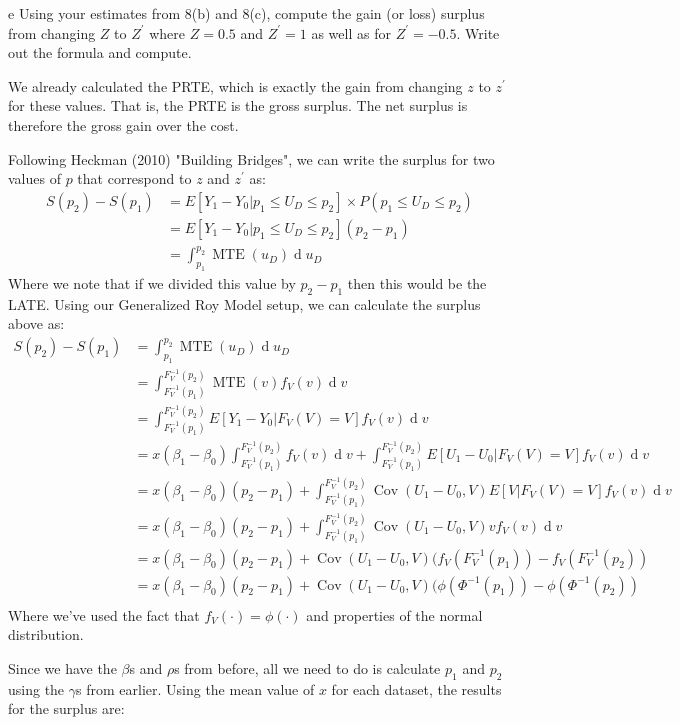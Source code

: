 \documentclass{article}
\begin{document}
\begin{problem}{e}
Using your estimates from 8(b) and 8(c), compute the gain (or loss) surplus from changing $Z$ to $Z^{\prime}$ where $Z=0.5$ and $Z^{\prime}=1$ as well as for $Z^{\prime}=-0.5$. Write out the formula and compute.
\end{problem}
\begin{solution}
We already calculated the PRTE, which is exactly the gain from changing $z$ to $z^\prime$ for these values. That is, the PRTE is the gross surplus. The net surplus is therefore the gross gain over the cost.

Following Heckman (2010) "Building Bridges", we can write the surplus for two values of $p$ that correspond to $z$ and $z^\prime$ as:
\begin{align*}
    S(p_2) - S(p_1) &= E[Y_1-Y_0| p_1 \leq U_D \leq p_2] \times P(p_1 \leq U_D \leq p_2) \\
    &= E[Y_1-Y_0| p_1 \leq U_D \leq p_2] (p_2-p_1) \\
    &= \int_{p_1}^{p_2} \operatorname{MTE}(u_D) \operatorname{d} u_D
\end{align*}
Where we note that if we divided this value by $p_2-p_1$ then this would be the LATE. Using our Generalized Roy Model setup, we can calculate the surplus above as:
\begin{align*}
    S(p_2) - S(p_1) &= \int_{p_1}^{p_2} \operatorname{MTE}(u_D) \operatorname{d} u_D \\
    &= \int_{F_V^{-1}(p_1)}^{F_V^{-1}(p_2)} \operatorname{MTE}(v) f_V(v) \operatorname{d} v \\
    &= \int_{F_V^{-1}(p_1)}^{F_V^{-1}(p_2)} E[Y_1-Y_0 | F_V(V)=V] f_V(v) \operatorname{d} v \\
    &= x(\beta_1-\beta_0) \int_{F_V^{-1}(p_1)}^{F_V^{-1}(p_2)}f_V(v)\operatorname{d} v  + 
    \int_{F_V^{-1}(p_1)}^{F_V^{-1}(p_2)} E[U_1 - U_0 | F_V(V)=V] f_V(v) \operatorname{d} v \\
    &= x(\beta_1-\beta_0) (p_2-p_1)  + 
    \int_{F_V^{-1}(p_1)}^{F_V^{-1}(p_2)}\operatorname{Cov}(U_1 - U_0,V) E[V | F_V(V)=V] f_V(v) \operatorname{d} v \\
    &= x(\beta_1-\beta_0) (p_2-p_1)  + 
    \int_{F_V^{-1}(p_1)}^{F_V^{-1}(p_2)}\operatorname{Cov}(U_1 - U_0,V) v f_V(v) \operatorname{d} v \\
    &= x(\beta_1-\beta_0) (p_2-p_1) + \operatorname{Cov}(U_1 - U_0,V) (f_V(F_V^{-1}(p_1)) - f_V(F_V^{-1}(p_2))  \\
    &= x(\beta_1-\beta_0) (p_2-p_1) + \operatorname{Cov}(U_1 - U_0,V) (\phi(\Phi^{-1}(p_1)) - \phi(\Phi^{-1}(p_2))  \\
\end{align*}
Where we've used the fact that $f_V(\cdot)=\phi(\cdot)$ and properties of the normal distribution.

Since we have the $\beta$s and $\rho$s from before, all we need to do is calculate $p_1$ and $p_2$ using the $\gamma$s from earlier. Using the mean value of $x$ for each dataset, the results for the surplus are:
%    


\end{solution}
\end{document}
